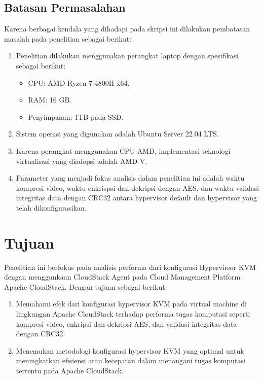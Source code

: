 \subsection{Batasan Permasalahan}
Karena berbagai kendala yang dihadapi pada skripsi ini dilakukan pembatasan masalah pada penelitian  sebagai berikut:
\begin{enumerate}
      \item Penelitian dilakukan menggunakan perangkat laptop dengan spesifikasi sebagai berikut:
            \begin{itemize}
                  \item CPU: AMD Ryzen 7 4800H x64.
                  \item RAM: 16 GB.
                  \item Penyimpanan: 1TB pada SSD.
            \end{itemize}
      \item Sistem operasi yang digunakan adalah Ubuntu Server 22.04 LTS.
      \item Karena perangkat menggunakan CPU AMD, implementasi teknologi virtualisasi yang diadopsi adalah AMD-V.
      \item Parameter yang menjadi fokus analisis dalam penelitian ini adalah waktu kompresi video, waktu enkrispsi dan dekripsi dengan AES, dan waktu validasi integritas data dengan CRC32 antara hypervisor default dan hypervisor yang telah dikonfigurasikan.
\end{enumerate}


\section{Tujuan}
Penelitian ini berfokus pada analisis performa dari konfigurasi Hypervirsor KVM dengan menggunkaan CloudStack Agent pada \f{Cloud Management Platform} Apache CloudStack. Dengan tujuan sebagai berikut:

\begin{enumerate}
      \item  Memahami efek dari konfigurasi hypervisor KVM pada virtual machine di lingkungan Apache CloudStack terhadap performa tugas komputasi seperti kompresi video, enkripsi dan dekripsi AES, dan validasi integritas data dengan CRC32.

      \item Menemukan metodologi konfigurasi hypervisor KVM yang optimal untuk meningkatkan efisiensi atau kecepatan dalam menangani tugas komputasi tertentu pada Apache CloudStack.

\end{enumerate}

